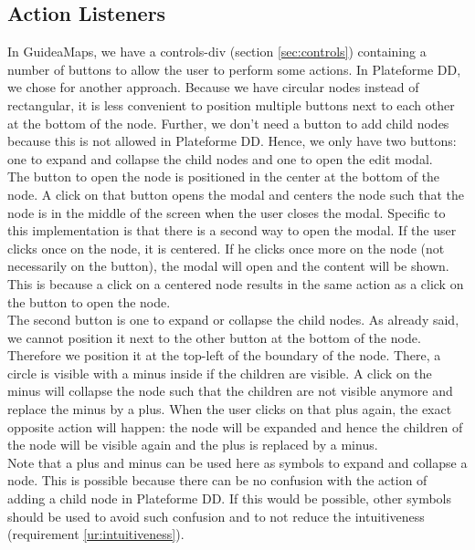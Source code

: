 \subsection{Action Listeners}\label{sec:usecase-actionlisteners}
In GuideaMaps, we have a controls-div (section \ref{sec:controls}) containing a number of buttons to allow the user to perform some actions. In Plateforme DD, we chose for another approach. Because we have circular nodes instead of rectangular, it is less convenient to position multiple buttons next to each other at the bottom of the node. Further, we don't need a button to add child nodes because this is not allowed in Plateforme DD. Hence, we only have two buttons: one to expand and collapse the child nodes and one to open the edit modal.\\

The button to open the node is positioned in the center at the bottom of the node. A click on that button opens the modal and centers the node such that the node is in the middle of the screen when the user closes the modal. Specific to this implementation is that there is a second way to open the modal. If the user clicks once on the node, it is centered. If he clicks once more on the node (not necessarily on the button), the modal will open and the content will be shown. This is because a click on a centered node results in the same action as a click on the button to open the node.\\

The second button is one to expand or collapse the child nodes. As already said, we cannot position it next to the other button at the bottom of the node. Therefore we position it at the top-left of the boundary of the node. There, a circle is visible with a minus inside if the children are visible. A click on the minus will collapse the node such that the children are not visible anymore and replace the minus by a plus. When the user clicks on that plus again, the exact opposite action will happen: the node will be expanded and hence the children of the node will be visible again and the plus is replaced by a minus.\\

Note that a plus and minus can be used here as symbols to expand and collapse a node. This is possible because there can be no confusion with the action of adding a child node in Plateforme DD. If this would be possible, other symbols should be used to avoid such confusion and to not reduce the intuitiveness (requirement \ref{ur:intuitiveness}).



